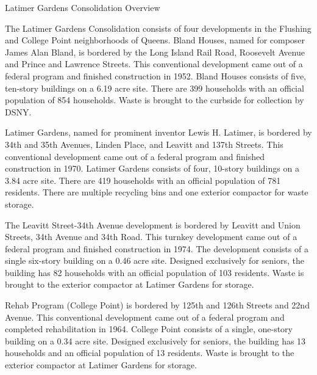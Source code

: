 Latimer Gardens Consolidation Overview

The Latimer Gardens Consolidation consists of four developments in the Flushing and College Point neighborhoods of Queens. Bland Houses, named for composer James Alan Bland, is bordered by the Long Island Rail Road, Roosevelt Avenue and Prince and Lawrence Streets. This conventional development came out of a federal program and finished construction in 1952. Bland Houses consists of five, ten-story buildings on a 6.19 acre site. There are 399 households with an official population of 854 households. Waste is brought to the curbside for collection by DSNY.

Latimer Gardens, named for prominent inventor Lewis H. Latimer, is bordered by 34th and 35th Avenues, Linden Place, and Leavitt and 137th Streets. This conventional development came out of a federal program and finished construction in 1970. Latimer Gardens consists of four, 10-story buildings on a 3.84 acre site. There are 419 households with an official population of 781 residents. There are multiple recycling bins and one exterior compactor for waste storage.

The Leavitt Street-34th Avenue development is bordered by Leavitt and Union Streets, 34th Avenue and 34th Road. This turnkey development came out of a federal program and finished construction in 1974. The development consists of a single six-story building on a 0.46 acre site. Designed exclusively for seniors, the building has 82 households with an official population of 103 residents. Waste is brought to the exterior compactor at Latimer Gardens for storage.

Rehab Program (College Point) is bordered by 125th and 126th Streets and 22nd Avenue. This conventional development came out of a federal program and completed rehabilitation in 1964. College Point consists of a single, one-story building on a 0.34 acre site. Designed exclusively for seniors, the building has 13 households and an official population of 13 residents. Waste is brought to the exterior compactor at Latimer Gardens for storage.

 